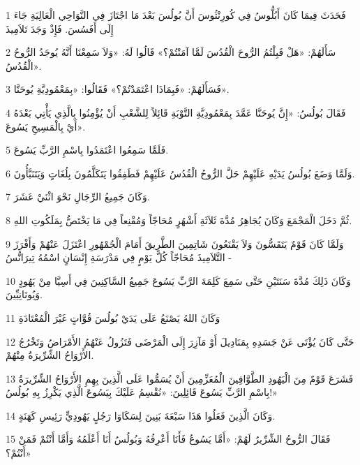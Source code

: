\par 1 فَحَدَثَ فِيمَا كَانَ أَبُلُّوسُ فِي كُورِنْثُوسَ أَنَّ بُولُسَ بَعْدَ مَا اجْتَازَ فِي النَّوَاحِي الْعَالِيَةِ جَاءَ إِلَى أَفَسُسَ. فَإِذْ وَجَدَ تَلاَمِيذَ
\par 2 سَأَلَهُمْ: «هَلْ قَبِلْتُمُ الرُّوحَ الْقُدُسَ لَمَّا آمَنْتُمْ؟» قَالُوا لَهُ: «وَلاَ سَمِعْنَا أَنَّهُ يُوجَدُ الرُّوحُ الْقُدُسُ».
\par 3 فَسَأَلَهُمْ: «فَبِمَاذَا اعْتَمَدْتُمْ؟» فَقَالُوا: «بِمَعْمُودِيَّةِ يُوحَنَّا».
\par 4 فَقَالَ بُولُسُ: «إِنَّ يُوحَنَّا عَمَّدَ بِمَعْمُودِيَّةِ التَّوْبَةِ قَائِلاً لِلشَّعْبِ أَنْ يُؤْمِنُوا بِالَّذِي يَأْتِي بَعْدَهُ أَيْ بِالْمَسِيحِ يَسُوعَ».
\par 5 فَلَمَّا سَمِعُوا اعْتَمَدُوا بِاسْمِ الرَّبِّ يَسُوعَ.
\par 6 وَلَمَّا وَضَعَ بُولُسُ يَدَيْهِ عَلَيْهِمْ حَلَّ الرُّوحُ الْقُدُسُ عَلَيْهِمْ فَطَفِقُوا يَتَكَلَّمُونَ بِلُغَاتٍ وَيَتَنَبَّأُونَ.
\par 7 وَكَانَ جَمِيعُ الرِّجَالِ نَحْوَ اثْنَيْ عَشَرَ.
\par 8 ثُمَّ دَخَلَ الْمَجْمَعَ وَكَانَ يُجَاهِرُ مُدَّةَ ثَلاَثَةِ أَشْهُرٍ مُحَاجّاً وَمُقْنِعاً فِي مَا يَخْتَصُّ بِمَلَكُوتِ اللهِ.
\par 9 وَلَمَّا كَانَ قَوْمٌ يَتَقَسُّونَ وَلاَ يَقْنَعُونَ شَاتِمِينَ الطَّرِيقَ أَمَامَ الْجُمْهُورِ اعْتَزَلَ عَنْهُمْ وَأَفْرَزَ التَّلاَمِيذَ مُحَاجّاً كُلَّ يَوْمٍ فِي مَدْرَسَةِ إِنْسَانٍ اسْمُهُ تِيرَانُّسُ -
\par 10 وَكَانَ ذَلِكَ مُدَّةَ سَنَتَيْنِ حَتَّى سَمِعَ كَلِمَةَ الرَّبِّ يَسُوعَ جَمِيعُ السَّاكِنِينَ فِي أَسِيَّا مِنْ يَهُودٍ وَيُونَانِيِّينَ.
\par 11 وَكَانَ اللهُ يَصْنَعُ عَلَى يَدَيْ بُولُسَ قُوَّاتٍ غَيْرَ الْمُعْتَادَةِ
\par 12 حَتَّى كَانَ يُؤْتَى عَنْ جَسَدِهِ بِمَنَادِيلَ أَوْ مَآزِرَ إِلَى الْمَرْضَى فَتَزُولُ عَنْهُمُ الأَمْرَاضُ وَتَخْرُجُ الأَرْوَاحُ الشِّرِّيرَةُ مِنْهُمْ.
\par 13 فَشَرَعَ قَوْمٌ مِنَ الْيَهُودِ الطَّوَّافِينَ الْمُعَزِّمِينَ أَنْ يُسَمُّوا عَلَى الَّذِينَ بِهِمِ الأَرْوَاحُ الشِّرِّيرَةُ بِاسْمِ الرَّبِّ يَسُوعَ قَائِلِينَ: «نُقْسِمُ عَلَيْكَ بِيَسُوعَ الَّذِي يَكْرِزُ بِهِ بُولُسُ!»
\par 14 وَكَانَ الَّذِينَ فَعَلُوا هَذَا سَبْعَةَ بَنِينَ لِسَكَاوَا رَجُلٍ يَهُودِيٍّ رَئِيسِ كَهَنَةٍ.
\par 15 فَقَالَ الرُّوحُ الشِّرِّيرُ لَهُمْ: «أَمَّا يَسُوعُ فَأَنَا أَعْرِفُهُ وَبُولُسُ أَنَا أَعْلَمُهُ وَأَمَّا أَنْتُمْ فَمَنْ أَنْتُمْ؟»
